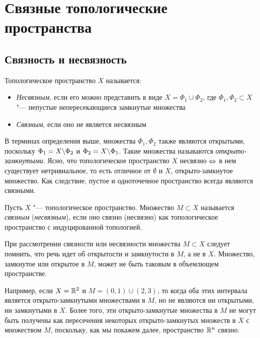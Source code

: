 \section{Связные топологические пространства}

\subsection{Связность и несвязность}

\begin{definition}
	Топологическое пространство $X$ называется:
	\begin{itemize}
		\item \textit{Несвязным}, если его можно представить в виде $X = \Phi_1\cup \Phi_2$, где $\Phi_1, \Phi_2 \subset X$ "--- не\-пус\-тые непересекающиеся замкнутые множества
		
		\item \textit{Связным}, если оно не является несвязным
	\end{itemize}
\end{definition}

\begin{note}
	В терминах определения выше, множества $\Phi_1, \Phi_2$ также являются открытыми, поскольку $\Phi_1 = X \backslash \Phi_2$ и $\Phi_2 = X \backslash \Phi_1$. Такие множества называются \textit{открыто-замкнутыми}. Ясно, что топологическое пространство $X$ несвязно $\Leftrightarrow$ в нем существует нетривиальное, то есть отличное от $\emptyset$ и $X$, открыто-замкнутое множество. Как следствие, пустое и одноточечное пространство всегда являются связными.
\end{note}

\begin{definition}
	Пусть $X$ "--- топологическое пространство. Множество $M \subset X$ называется \textit{связным} (\textit{несвязным}), если оно связно (несвязно) как
	топологическое пространство с индуцированной топологией.
\end{definition}

\begin{note}
	При рассмотрении связности или несвязности множества $M \subset X$ следует помнить, что речь идет об открытости и замкнутости в $M$, а не в $X$. Множество, замкнутое или открытое в $M$, может не быть таковым в объемлющем пространстве.
	
	Например, если $X = \mathbb{R}^2$ и $M = (0, 1) \cup (2, 3)$, то когда оба этих интервала является открыто-замкнутыми множествами в $M$, но не являются ни открытыми, ни замкнутыми в $X$. Более того, эти открыто-замкнутые множества в $M$ не могут быть получены как пересечения некоторых открыто-замкнутых множеств в $X$ с множеством $M$, поскольку, как мы покажем далее, пространство $\mathbb{R}^n$ связно.
\end{note}

